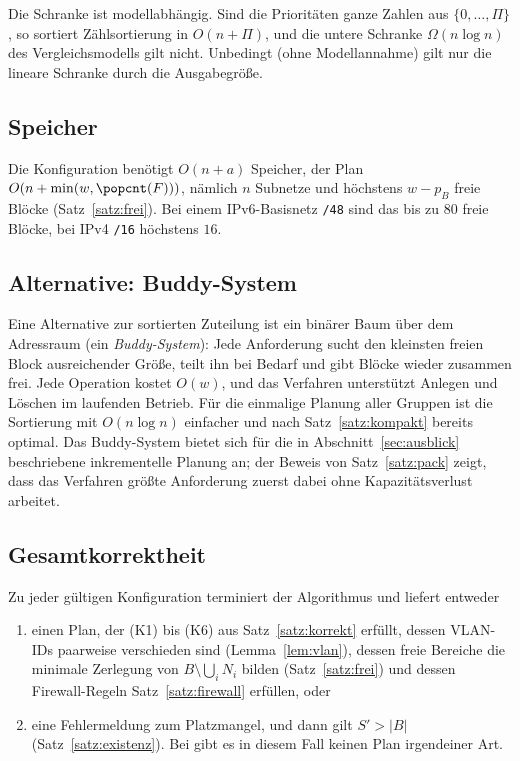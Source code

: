 \begin{bemerkung}
	Die Schranke ist modellabhängig. Sind die Prioritäten ganze Zahlen aus $\{0,\ldots,\Pi\}$, so sortiert Zählsortierung in $O(n + \Pi)$, und die untere Schranke $\Omega(n\log n)$ des Vergleichsmodells gilt nicht. Unbedingt (ohne Modellannahme) gilt nur die lineare Schranke durch die Ausgabegröße.
\end{bemerkung}

\subsection{Speicher}

Die Konfiguration benötigt $O(n + a)$ Speicher, der Plan $O(n + \min(w, \popcnt(F)))$, nämlich $n$ Subnetze und höchstens $w - p_B$ freie Blöcke (Satz~\ref{satz:frei}). Bei einem IPv6-Basisnetz \texttt{/48} sind das bis zu $80$ freie Blöcke, bei IPv4 \texttt{/16} höchstens $16$.

\subsection{Alternative: Buddy-System}

Eine Alternative zur sortierten Zuteilung ist ein binärer Baum über dem Adressraum (ein \emph{Buddy-System}): Jede Anforderung sucht den kleinsten freien Block ausreichender Größe, teilt ihn bei Bedarf und gibt Blöcke wieder zusammen frei. Jede Operation kostet $O(w)$, und das Verfahren unterstützt Anlegen und Löschen im laufenden Betrieb. Für die einmalige Planung aller Gruppen ist die Sortierung mit $O(n\log n)$ einfacher und nach Satz~\ref{satz:kompakt} bereits optimal. Das Buddy-System bietet sich für die in Abschnitt~\ref{sec:ausblick} beschriebene inkrementelle Planung an; der Beweis von Satz~\ref{satz:pack} zeigt, dass das Verfahren \glqq größte Anforderung zuerst\grqq{} dabei ohne Kapazitätsverlust arbeitet.

\subsection{Gesamtkorrektheit}

\begin{satz}[Korrektheit]
\label{satz:gesamt}
	Zu jeder gültigen Konfiguration terminiert der Algorithmus und liefert entweder
	\begin{enumerate}[label=(\alph*)]
		\item einen Plan, der (K1) bis (K6) aus Satz~\ref{satz:korrekt} erfüllt, dessen VLAN-IDs paarweise verschieden sind (Lemma~\ref{lem:vlan}), dessen freie Bereiche die minimale Zerlegung von $B \setminus \bigcup_i N_i$ bilden (Satz~\ref{satz:frei}) und dessen Firewall-Regeln Satz~\ref{satz:firewall} erfüllen, oder
		\item eine Fehlermeldung zum Platzmangel, und dann gilt $S' > |B|$ (Satz~\ref{satz:existenz}). Bei  gibt es in diesem Fall keinen Plan irgendeiner Art.
	\end{enumerate}
\end{satz}

